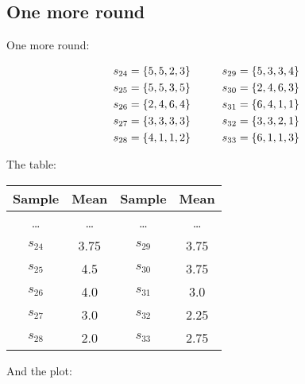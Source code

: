\documentclass[../../../main.tex]{subfiles}
\begin{document}
\subsection{One more round}

One more round:

\begin{align*}
  s_{24} = \{ 5, 5, 2, 3 \} \hskip 1cm s_{29} = \{ 5, 3, 3, 4 \} \\
  s_{25} = \{ 5, 5, 3, 5 \} \hskip 1cm s_{30} = \{ 2, 4, 6, 3 \} \\
  s_{26} = \{ 2, 4, 6, 4 \} \hskip 1cm s_{31} = \{ 6, 4, 1, 1 \} \\
  s_{27} = \{ 3, 3, 3, 3 \} \hskip 1cm s_{32} = \{ 3, 3, 2, 1 \} \\
  s_{28} = \{ 4, 1, 1, 2 \} \hskip 1cm s_{33} = \{ 6, 1, 1, 3 \}  
\end{align*}

\noindent
The table:

\begin{center}
  \begin{tabular}{| c | c || c | c |}
    \hline
    \textbf{Sample} & \textbf{Mean} & \textbf{Sample} & \textbf{Mean} \\ \hline
    \ldots & \ldots & \ldots & \ldots \\ \hline
    $s_{24}$ & 3.75 & $s_{29}$ & 3.75 \\ \hline
    $s_{25}$ & 4.5 & $s_{30}$ & 3.75 \\ \hline
    $s_{26}$ & 4.0 & $s_{31}$ & 3.0 \\ \hline
    $s_{27}$ & 3.0 & $s_{32}$ & 2.25 \\ \hline
    $s_{28}$ & 2.0 & $s_{33}$ & 2.75 \\ \hline
  \end{tabular}
\end{center}

\noindent
And the plot:

\begin{center}
\end{center}
\end{document}
